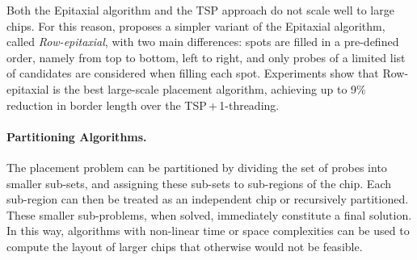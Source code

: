 \documentclass[english]{lni}
\newcommand{\ignore}[1]{}
\begin{document}
\ignore{
The major problem with the epitaxial and the TSP-based algorithm is that they
have at least quadratic time complexity and thus are not scalable for the
latest million-probe microarrays. According to their experiments, the TSP
approach needed around 32 minutes to produce the layout of a 200\,x\,200 chip,
whereas the epitaxial algorithm needed 74 minutes on average. For a 500\,x\,500
chip, the TSP took over 30 hours to complete, whereas the epitaxial algorithm
did not complete ``due to prohibitively large running time or memory
requirements'' \cite{KAHNG02}.
}

\ignore{
This observation has led to the development of two new algorithms by
\cite{KAHNG03A}. The first one, called sliding-window matching (SWM), is not
exactly a placement algorithm as it iteratively improves an initial placement
that can be constructed by, for instance, TSP and 1-threading. Improvements
are achieved by selecting an independent set of spots inside the window and
optimally replacing their probes using a minimum-weight perfect matching
algorithm. The term independent refers to probes that can be replaced without
affecting the border length of the other selected probes.
}

Both the Epitaxial algorithm and the TSP approach do not scale well to large
chips. For this reason, \cite{KAHNG03A} proposes a simpler variant of the
Epitaxial algorithm, called \emph{Row-epitaxial}, with two main differences:
spots are filled in a pre-defined order, namely from top to bottom, left to
right, and only probes of a limited list of candidates are considered when
filling each spot. Experiments show that Row-epitaxial is the best
large-scale placement algorithm, achieving up to 9\% reduction in border
length over the TSP\,+\,1-threading.

\paragraph{Partitioning Algorithms.}
The placement problem can be partitioned by dividing the set of probes into
smaller sub-sets, and assigning these sub-sets to sub-regions of the chip.
Each sub-region can then be treated as an independent chip or recursively
partitioned. These smaller sub-problems, when solved, immediately constitute a
final solution. In this way, algorithms with non-linear time or space
complexities can be used to compute the layout of larger chips that otherwise
would not be feasible.
\end{document}
